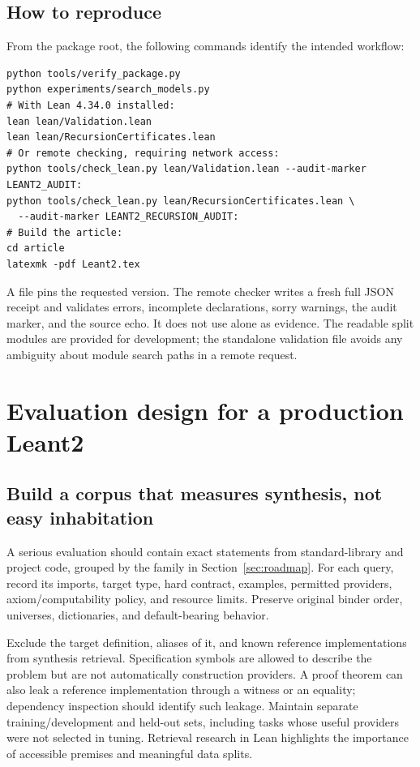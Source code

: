 \documentclass[11pt,letterpaper]{article}
\newcommand{\code}[1]{\texttt{\detokenize{#1}}}
\theoremstyle{definition}\newtheorem{definition}[theorem]{Definition}
\theoremstyle{remark}\newtheorem{remark}[theorem]{Remark}
\begin{document}
\subsection{How to reproduce}

From the package root, the following commands identify the intended workflow:
\begin{lstlisting}[language={}]
python tools/verify_package.py
python experiments/search_models.py
# With Lean 4.34.0 installed:
lean lean/Validation.lean
lean lean/RecursionCertificates.lean
# Or remote checking, requiring network access:
python tools/check_lean.py lean/Validation.lean --audit-marker LEANT2_AUDIT:
python tools/check_lean.py lean/RecursionCertificates.lean \
  --audit-marker LEANT2_RECURSION_AUDIT:
# Build the article:
cd article
latexmk -pdf Leant2.tex
\end{lstlisting}

A \code{lean-toolchain} file pins the requested version. The remote checker writes
a fresh full JSON receipt and validates errors, incomplete declarations, sorry
warnings, the audit marker, and the source echo. It does not use \code{okay=true}
alone as evidence. The readable split modules are provided for development; the
standalone validation file avoids any ambiguity about module search paths in a
remote request.

\section{Evaluation design for a production Leant2}
\label{sec:evaluation}

\subsection{Build a corpus that measures synthesis, not easy inhabitation}

A serious evaluation should contain exact statements from standard-library and
project code, grouped by the family in Section~\ref{sec:roadmap}. For each query,
record its imports, target type, hard contract, examples, permitted providers,
axiom/computability policy, and resource limits. Preserve original binder order,
universes, dictionaries, and default-bearing behavior.

Exclude the target definition, aliases of it, and known reference implementations
from synthesis retrieval. Specification symbols are allowed to describe the
problem but are not automatically construction providers. A proof theorem can
also leak a reference implementation through a witness or an equality; dependency
inspection should identify such leakage. Maintain separate training/development
and held-out sets, including tasks whose useful providers were not selected in
tuning. Retrieval research in Lean highlights the importance of accessible
premises and meaningful data splits.\cite{leandojo}
\end{document}
